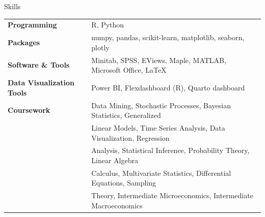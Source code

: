 \documentclass{resume} %
\begin{document}
	
	\begin{rSection}{Skills}
		
		\begin{tabular}{ @{} >{\bfseries}l @{\hspace{6ex}} l }
			Programming & R, Python \\
			Packages & numpy, pandas, scikit-learn, matplotlib, seaborn, plotly \\
			Software \& Tools & Minitab, SPSS, EViews, Maple, MATLAB, Microsoft Office, \LaTeX \\
			Data Visualization Tools & Power BI, Flexdashboard (R), Quarto dashboard \\
			Coursework & Data Mining, Stochastic Processes, Bayesian Statistics, Generalized \\ 
			& Linear Models, Time Series Analysis, Data Visualization, Regression \\ 
			& Analysis, Statistical Inference, Probability Theory, Linear Algebra \\ 
			& Calculus, Multivariate Statistics, Differential Equations, Sampling \\
			& Theory, Intermediate Microeconomics, Intermediate Macroeconomics \\
			
		\end{tabular}
		
	\end{rSection}
	
	
	
	
\end{document}
